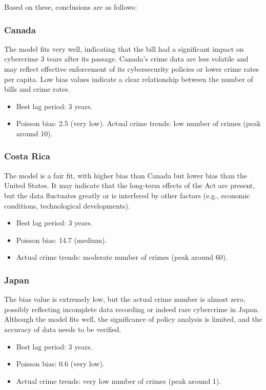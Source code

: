     Based on these, conclusions are as follows:
    \subsubsection*{Canada} %
        The model fits very well,
        indicating that the bill had a significant impact on cybercrime 3 tears after its passage.
        Canada's crime data are less volatile and
        may reflect effective enforcement of its cybersecurity policies or lower crime rates per capita.
        Low bias values indicate a clear relationship between the number of bills and crime rates.
        \begin{itemize}
            \item Best lag period: 3 years.
            \item Poisson bias: 2.5 (very low).
            Actual crime trends: low number of crimes (peak around 10).
        \end{itemize}
    \subsubsection*{Costa Rica} %
        The model is a fair fit, with higher bias than Canada but lower bias than the United States.
        It may indicate that the long-term effects of the Act are present,
        but the data fluctuates greatly or is interfered by other factors
        (e.g., economic conditions, technological developments).
        \begin{itemize}
            \item Best lag period: 3 years.
            \item Poisson bias: 14.7 (medium).
            \item Actual crime trends: moderate number of crimes (peak around 60).
        \end{itemize}
    \subsubsection*{Japan} %
        The bias value is extremely low, but the actual crime number is almost zero,
        possibly reflecting incomplete data recording or indeed rare cybercrime in Japan.
        Although the model fits well, 
        the significance of policy analysis is limited, and the accuracy of data needs to be verified.
        \begin{itemize}
            \item Best lag period: 3 years.
            \item Poisson bias: 0.6 (very low).
            \item Actual crime trends: very low number of crimes (peak around 1).
        \end{itemize}
